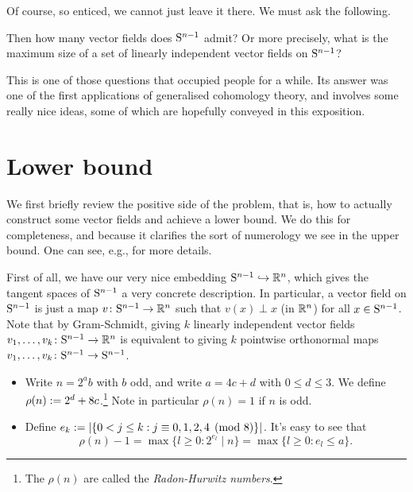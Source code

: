 Of course, so enticed, we cannot just leave it there. We must ask the
following.

\begin{question}
  \label{vfield-prob}
  Then how many vector fields does $\S^{n-1}$ admit? Or more
  precisely, what is the maximum size of a set of linearly independent
  vector fields on $\S^{n-1}$?
\end{question}

This is one of those questions that occupied people for a while. Its
answer was one of the first applications of generalised cohomology
theory, and involves some really nice ideas, some of which are
hopefully conveyed in this exposition.


\section{Lower bound}

We first briefly review the positive side of the problem, that is, how
to actually construct some vector fields and achieve a lower bound. We
do this for completeness, and because it clarifies the sort of
numerology we see in the upper bound. One can see, e.g.,
\cite{hopkins-256y, miller-vfields} for more details.

\begin{nothing}
  \label{gram-schmidt}
  First of all, we have our very nice embedding $\S^{n-1} \inj \R^n$,
  which gives the tangent spaces of $\S^{n-1}$ a very concrete
  description. In particular, a vector field on $\S^{n-1}$ is just a
  map $v \c \S^{n-1} \to \R^n$ such that $v(x) \perp x$ (in $\R^n$)
  for all $x \in \S^{n-1}$. Note that by Gram-Schmidt, giving $k$
  linearly independent vector fields $v_1,\ldots,v_k \c \S^{n-1} \to
  \R^n$ is equivalent to giving $k$ pointwise orthonormal maps
  $v_1,\ldots,v_k \c \S^{n-1} \to \S^{n-1}$.
\end{nothing}

\begin{notation}
  \label{radon-hurwitz}
  \begin{itemize}[leftmargin=*]
  \item Write $n = 2^ab$ with $b$ odd, and write $a = 4c + d$ with $0
    \le d \le 3$. We define $\rho(n) \ce 2^d + 8c$.\footnote{The
      $\rho(n)$ are called the \emph{Radon-Hurwitz numbers}.} Note in
    particular $\rho(n) = 1$ if $n$ is odd.
  \item Define $e_k \ce |\{0 < j \le k : j \equiv 0,1,2,4 \pmod
    8\}|$. It's easy to see that
    \begin{equation}
      \label{radon-max}
      \rho(n) - 1 = \max \{l \ge 0 : 2^{e_l} \mid n\} = \max \{l
      \ge 0 : e_l \le a\}.
  \end{equation}
  \end{itemize}
\end{notation}

